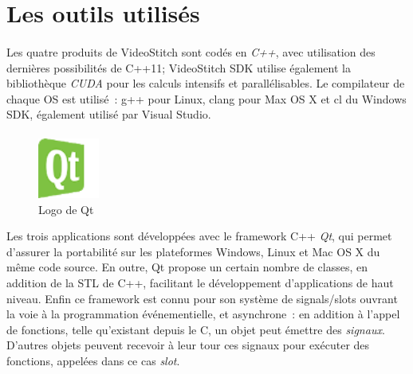 \section{Les outils utilisés}
\label{outils-utilisés}
\paragraph{}
Les quatre produits de VideoStitch sont codés en \emph{C++}, avec utilisation des dernières possibilités
de C++11; VideoStitch SDK utilise également la bibliothèque \emph{CUDA} pour les calculs intensifs et parallélisables.
Le compilateur de chaque OS est utilisé~: g++ pour Linux, clang pour Max OS X et 
cl du Windows SDK, également utilisé par Visual Studio.
\paragraph{}
\begin{figure}
  \centering
  \includegraphics[width=2cm]{images/qt-logo.png}
  \caption{Logo de Qt}
\end{figure}
Les trois applications sont  
développées avec le framework C++ \emph{Qt}, qui permet d'assurer la portabilité sur les 
plateformes Windows, Linux et Mac OS X du même code source. En outre, Qt
propose un certain nombre de classes, en addition de la STL de C++, facilitant le
développement d'applications de haut niveau. Enfin ce framework est connu pour son
système de signals/slots ouvrant la voie à la programmation événementielle, et
asynchrone~: en addition à l'appel de fonctions, telle qu'existant depuis le C,
un objet peut émettre des \textit{signaux}. D'autres objets peuvent recevoir à leur tour
ces signaux pour exécuter des fonctions, appelées dans ce cas \textit{slot}.\cite{qt}
